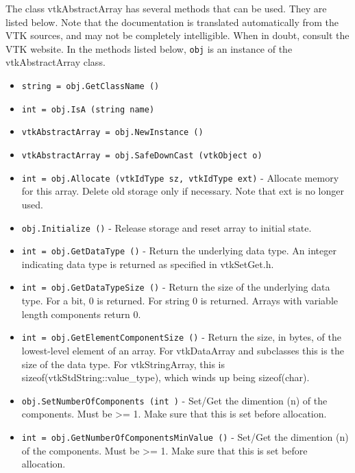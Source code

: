 The class vtkAbstractArray has several methods that can be used.
  They are listed below.
Note that the documentation is translated automatically from the VTK sources,
and may not be completely intelligible.  When in doubt, consult the VTK website.
In the methods listed below, \verb|obj| is an instance of the vtkAbstractArray class.
\begin{itemize}
\item  \verb|string = obj.GetClassName ()|

\item  \verb|int = obj.IsA (string name)|

\item  \verb|vtkAbstractArray = obj.NewInstance ()|

\item  \verb|vtkAbstractArray = obj.SafeDownCast (vtkObject o)|

\item  \verb|int = obj.Allocate (vtkIdType sz, vtkIdType ext)| -  Allocate memory for this array. Delete old storage only if necessary.
 Note that ext is no longer used.

\item  \verb|obj.Initialize ()| -  Release storage and reset array to initial state.

\item  \verb|int = obj.GetDataType ()| -  Return the underlying data type. An integer indicating data type is 
 returned as specified in vtkSetGet.h.

\item  \verb|int = obj.GetDataTypeSize ()| -  Return the size of the underlying data type.  For a bit, 0 is
 returned.  For string 0 is returned. Arrays with variable length
 components return 0.

\item  \verb|int = obj.GetElementComponentSize ()| -  Return the size, in bytes, of the lowest-level element of an
 array.  For vtkDataArray and subclasses this is the size of the
 data type.  For vtkStringArray, this is
 sizeof(vtkStdString::value\_type), which winds up being
 sizeof(char).  

\item  \verb|obj.SetNumberOfComponents (int )| -  Set/Get the dimention (n) of the components. Must be >= 1. Make sure that
 this is set before allocation.

\item  \verb|int = obj.GetNumberOfComponentsMinValue ()| -  Set/Get the dimention (n) of the components. Must be >= 1. Make sure that
 this is set before allocation.


\end{itemize}
